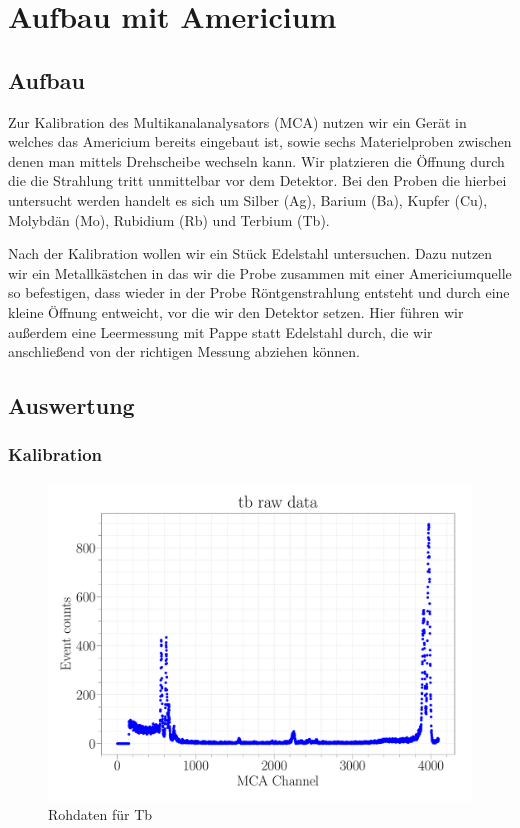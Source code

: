 \documentclass[a4paper,14pt]{article}
\begin{document}
\section{Aufbau mit Americium}
\subsection{Aufbau}
Zur Kalibration des Multikanalanalysators (MCA) nutzen wir ein Gerät in welches das Americium bereits eingebaut ist, sowie sechs Materielproben zwischen denen man mittels Drehscheibe wechseln kann. Wir platzieren die Öffnung durch die die Strahlung tritt unmittelbar vor dem Detektor.
Bei den Proben die hierbei untersucht werden handelt es sich um Silber (Ag), Barium (Ba), Kupfer (Cu), Molybdän (Mo), Rubidium (Rb) und Terbium (Tb).

Nach der Kalibration wollen wir ein Stück Edelstahl untersuchen. Dazu nutzen wir ein Metallkästchen in das wir die Probe zusammen mit einer Americiumquelle so befestigen, dass wieder in der Probe Röntgenstrahlung entsteht und durch eine kleine Öffnung entweicht, vor die wir den Detektor setzen. Hier führen wir außerdem eine Leermessung mit Pappe statt Edelstahl durch, die wir anschließend von der richtigen Messung abziehen können.

\subsection{Auswertung}
\subsubsection{Kalibration}

\begin{figure}[H]
\centering
\includegraphics[width=\textwidth]{../Figures/am_tb_raw.pdf}
\caption{Rohdaten für Tb}
\label{am_tb_raw}
\end{figure}
\end{document}
